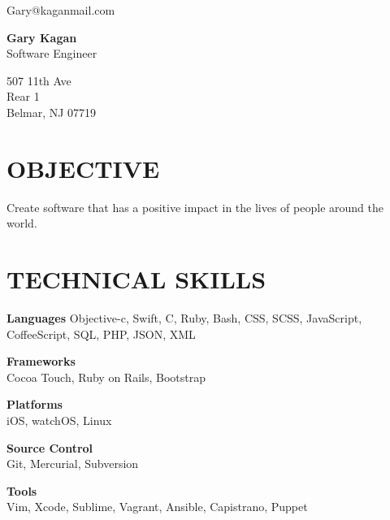 \documentclass{res}
\begin{document}
 
\begin{multicols}{3}
\begin{flushleft}
Gary@kaganmail.com\\[0.3em]
\end{flushleft}
\columnbreak
\begin{center}
{\huge\textbf{Gary Kagan}}\\
Software Engineer
\end{center}
\columnbreak
\begin{flushright}
507 11th Ave\\
Rear 1\\
Belmar, NJ 07719
\end{flushright}
\end{multicols}


\begin{resume}
\section{OBJECTIVE}          
    Create software that has a positive impact in the lives of people around the world.

\section{TECHNICAL SKILLS}
    \textbf{Languages}
    Objective-c, Swift, C, Ruby, Bash, CSS, SCSS, JavaScript, CoffeeScript, SQL, PHP, JSON, XML

    \begin{multicols}{2}
    \begin{flushleft}
    \textbf{Frameworks}\\
    Cocoa Touch, Ruby on Rails, Bootstrap
    \end{flushleft}
    \columnbreak
    \textbf{Platforms}\\
    iOS, watchOS, Linux
    \end{multicols}

    \begin{multicols}{2}
    \begin{flushleft}
    \textbf{Source Control}\\
    Git, Mercurial, Subversion
    \end{flushleft}
    \columnbreak
    \textbf{Tools}\\
    Vim, Xcode, Sublime, Vagrant, Ansible, Capistrano, Puppet
    \end{multicols}



\end{resume}
\end{document}
